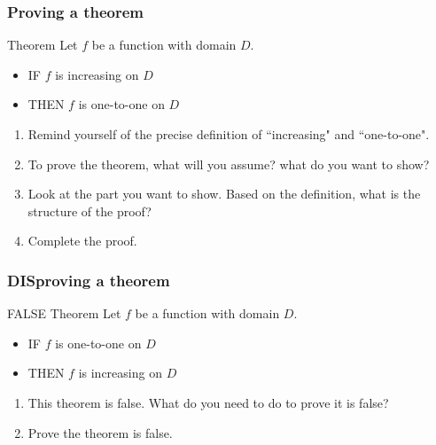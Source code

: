 \begin{frame}
	\frametitle{Proving a theorem}

	\begin{block}{Theorem}
		Let $f$ be a function with domain $D$.
		\begin{itemize}
			\item IF $f$ is increasing on $\displaystyle D$

			\item THEN $f$ is one-to-one on $\displaystyle D$
		\end{itemize}
	\end{block}

	\vfill

	\begin{enumerate}
		\item Remind yourself of the precise definition of ``increasing" and ``one-to-one".

		\item To prove the theorem, what will you assume? what do you want to show?

		\item Look at the part you want to show. Based on the definition, what is the
			structure of the proof?

		\item Complete the proof.
	\end{enumerate}
\end{frame}

\begin{frame}
	\frametitle{DISproving a theorem}

	\begin{block}{ FALSE Theorem}
		Let $f$ be a function with domain $D$.
		\begin{itemize}
			\item IF $f$ is one-to-one on $\displaystyle D$

			\item THEN $f$ is increasing on $\displaystyle D$
		\end{itemize}
	\end{block}

	\vfill

	\begin{enumerate}
		\item This theorem is false. What do you need to do to prove it is false?

		\item Prove the theorem is false.
	\end{enumerate}
\end{frame}


